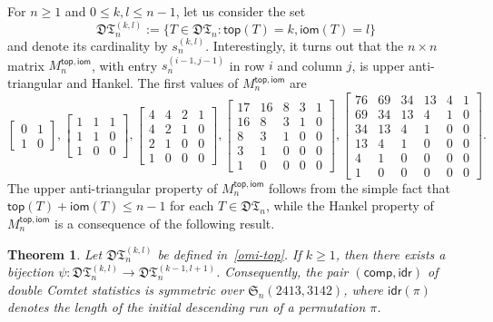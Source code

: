 \documentclass[12pt]{amsart}
\numberwithin{equation}{section}
\theoremstyle{plain}
\newtheorem{theorem}{Theorem}[section]
\theoremstyle{definition}
\def\S{\mathfrak{S}}
\def\comp{\mathsf{comp}}
\newcommand{\DT}{\mathfrak{DT}}
\def\top{\mathsf{top}}
\def\iom{\mathsf{iom}}
\def\idr{\mathsf{idr}}
\begin{document}
For $n\geq1$ and  $0\leq k,l\leq n-1$, let us consider the set 
\begin{equation}\label{omi-top}
\DT_n^{(k,l)}:=\{T\in\DT_n: \top(T)=k, \iom(T)=l\}
\end{equation}
and denote its cardinality by $s_n^{(k,l)}$. Interestingly, it turns out that the $n\times n$ matrix $M_n^{\top,\iom}$, with entry $s_n^{(i-1,j-1)}$ in row $i$ and column $j$, is upper anti-triangular and Hankel. The first values of $M_n^{\top,\iom}$ are 
$$
\begin{bmatrix}\label{tri:Sch2}
0& 1 \\
1 & 0 
\end{bmatrix},
\begin{bmatrix}\label{tri:Sch3}
1 & 1 & 1 \\
1 & 1  & 0\\
1 & 0 & 0
\end{bmatrix},
\begin{bmatrix}\label{tri:Sch4}
4 & 4 & 2&1 \\
4 & 2  & 1&0\\
2 & 1 & 0&0\\
1&0&0&0
\end{bmatrix},
\begin{bmatrix}\label{tri:Sch5}
17 & 16 & 8&3 &1\\
16 & 8  & 3&1&0\\
8 & 3& 1&0&0\\
3&1&0&0&0\\
1&0&0&0&0
\end{bmatrix},
\begin{bmatrix}\label{tri:Sch}
76 & 69 & 34&13 &4&1\\
69 & 34 & 13&4&1&0\\
34 & 13& 4&1&0&0\\
13&4&1&0&0&0\\
4&1&0&0&0&0\\
1&0&0&0&0&0
\end{bmatrix}.
$$
The upper anti-triangular property of $M_n^{\top,\iom}$ follows from the simple fact that $\top(T)+\iom(T)\leq n-1$ for each $T\in\DT_n$, while the Hankel property of $M_n^{\top,\iom}$ is a consequence of the following result. 



\begin{theorem}\label{thm:bij2}
Let $\DT_n^{(k,l)}$ be defined in~\eqref{omi-top}. If $k\geq1$, then there exists a bijection $\psi:\DT_n^{(k,l)}\rightarrow \DT_n^{(k-1,l+1)}$. Consequently, the pair $(\comp,\idr)$ of double Comtet statistics is symmetric over $\S_n(2413,3142)$, where $\idr(\pi)$ denotes the length of the initial descending  run of a permutation $\pi$.
\end{theorem}
\end{document}
